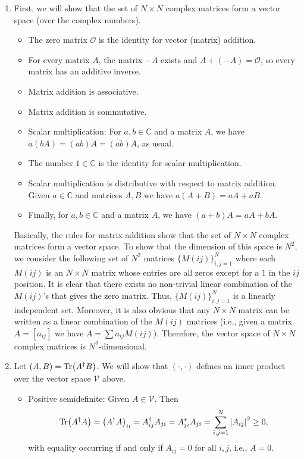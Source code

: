 \documentclass{article}
\theoremstyle{definition}
\newcommand{\lp}{\left(}
\newcommand{\rp}{\right)}
\begin{document}
\begin{enumerate}[label = (\alph*)]
	\item First, we will show that the set of $N\times N$ complex matrices form a vector space (over the complex numbers). 
	\begin{itemize}
		\item The zero matrix $\mathcal{O}$ is the identity for vector (matrix) addition. 
		\item For every matrix $A$, the matrix $-A$ exists and $A+(-A)=\mathcal{O}$, so every matrix has an additive inverse. 
		\item Matrix addition is associative.
		\item Matrix addition is commutative. 
		\item Scalar multiplication: For $a,b\in \mathbb{C}$ and a matrix $A$, we have $a(bA) = (ab)A = (ab)A$, as usual. 
		\item The number $1\in \mathbb{C}$ is the identity for scalar multiplication.
		\item Scalar multiplication is distributive with respect to matrix addition. Given $a\in \mathbb{C}$ and matrices $A,B$ we have $a(A+B) = aA + aB$. 
		\item Finally, for $a,b\in \mathbb{C}$ and a matrix $A$, we have $(a+b)A = aA + bA$. 
	\end{itemize}
	Basically, the rules for matrix addition show that the set of $N\times N$ complex matrices form a vector space. To show that the dimension of this space is $N^2$, we consider the following set of $N^2$ matrices $\{ M(ij)\}_{i,j = 1}^{N}$ where each $M(ij)$ is an $N\times N$ matrix whose entries are all zeros except for a $1$ in the $ij$ position.  It is clear that there exists no non-trivial linear combination of the $M(ij)$'s that gives the zero matrix. Thus, $\{M(ij)\}_{i,j=1}^N$ is a linearly independent set. Moreover, it is also obvious that any $N\times N$ matrix can be written as a linear combination of the $M(ij)$ matrices (i.e., given a matrix $A = [a_{ij}]$ we have $A = \sum a_{ij} M(ij)$). Therefore, the vector space of $N\times N$ complex matrices is $N^2$-dimensional. 
	
	
	\item Let $(A,B) = \Tr(A^\dagger B)$. We will show that $(\cdot , \cdot)$ defines an inner product over the vector space $\mathcal{V}$ above. 
	\begin{itemize}
		\item Positive semidefinite: Given $A\in \mathcal{V}$. Then 
		\begin{align*}
		\Tr(A^\dagger A) = \lp A^\dagger A \rp_{ii} = A^\dagger_{ij}A_{ji} = A^*_{ji}A_{ji} = \sum_{i,j=1}^N \abs{A_{ij}}^2 \geq 0,
		\end{align*}
		with equality occurring if and only if $A_{ij} = 0$ for all $i,j$, i.e., $A = 0$. 
		

\end{itemize}
\end{enumerate}
\end{document}
